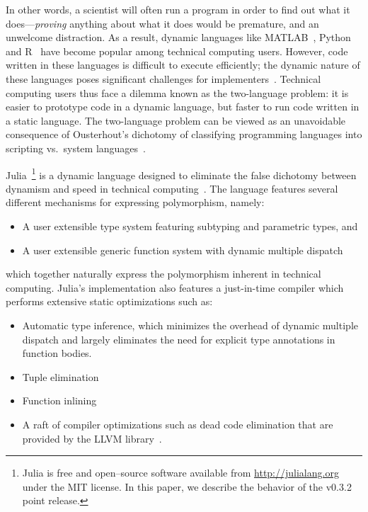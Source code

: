 \documentclass[pldi]{sigplanconf-pldi15}
\begin{document}
In other words, a scientist will often run a program in order to find out what
it does---\emph{proving} anything about what it does would be premature, and an
unwelcome distraction. As a result, dynamic languages like
MATLAB~\cite{matlab}, Python~\cite{pythonlib,pythonref} and R~\cite{rlang} have
become popular among technical computing users.
However, code written in these languages is difficult to execute efficiently;
the dynamic nature of these languages poses significant challenges for
implementers~\cite{Joisha2001,Joisha2006,Seljebotn2009}. Technical computing users
thus face a dilemma known as the two-language problem: it is easier to
prototype code in a dynamic language, but faster to run code written in a
static language. The two-language problem can be viewed as an unavoidable
consequence of Ousterhout's dichotomy of classifying programming languages into
scripting vs.\ system languages~\cite{Ousterhout1998,Hoare2014}.

Julia~\footnote{Julia is free and open--source software available from
\url{http://julialang.org} under the MIT license. In this paper, we describe
the behavior of the v0.3.2 point release.} is a dynamic language designed to
eliminate the false dichotomy between dynamism and
speed in technical computing~\cite{Bezanson2012,Bezanson2014b}.
The language features several
different mechanisms for expressing polymorphism, namely:

\begin{itemize}
	\item A user extensible type system featuring subtyping and parametric
		types, and
	\item A user extensible generic function system with dynamic multiple
		dispatch
\end{itemize}
%
which together naturally express the polymorphism inherent in technical
computing. Julia's implementation also features a just-in-time compiler which
performs extensive static optimizations such as:

\begin{itemize}
	\item Automatic type inference, which minimizes the overhead of dynamic
	      multiple dispatch and largely eliminates the need for explicit
	      type annotations in function bodies.
	\item Tuple elimination
	\item Function inlining
	\item A raft of compiler optimizations such as dead code elimination that
	      are provided by the LLVM library~\cite{Lattner2004}.
\end{itemize}
\end{document}
